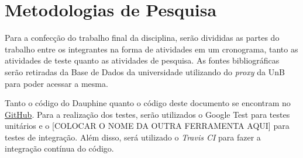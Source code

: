 \chapter[Metodologias de Pesquisa]{Metodologias de Pesquisa}

Para a confecção do trabalho final da disciplina, serão divididas as partes do trabalho entre os integrantes na forma de atividades em um cronograma, tanto as atividades de teste quanto as atividades de pesquisa. As fontes bibliográficas serão retiradas da Base de Dados da universidade utilizando do \textit{proxy} da UnB para poder acessar a mesma. 

Tanto o código do Dauphine quanto o código deste documento se encontram no \href{https://github.com/CaioIcy/Dauphine}{GitHub}. Para a realização dos testes, serão utilizados o Google Test para testes unitários e o [COLOCAR O NOME DA OUTRA FERRAMENTA AQUI] para testes de integração. Além disso, será utilizado o \textit{Travis CI} para fazer a integração contínua do código.
